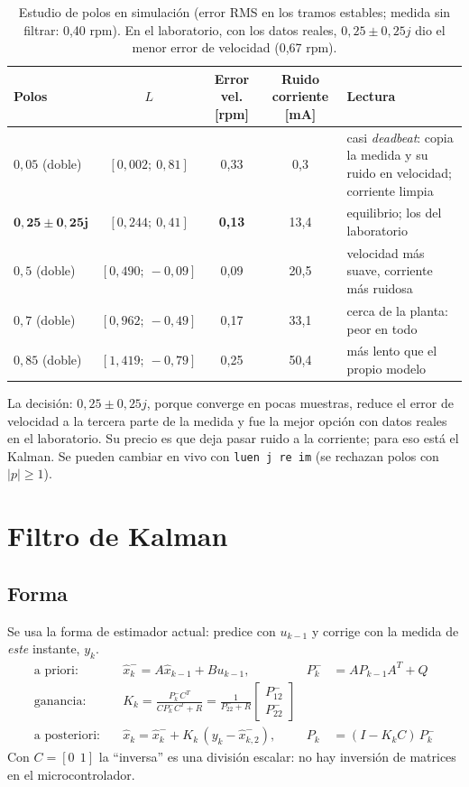 \documentclass[11pt]{article}
\newcommand{\cod}[1]{\texttt{#1}}
\begin{document}
\begin{table}[H]\centering\small
\begin{tabular}{lccc>{\raggedright\arraybackslash}p{5.2cm}}
\toprule
Polos & $L$ & Error vel. [rpm] & Ruido corriente [mA] & Lectura \\
\midrule
$0{,}05$ (doble) & $[0{,}002;\ 0{,}81]$ & 0,33 & 0,3 & casi \emph{deadbeat}: copia la medida y su ruido en velocidad; corriente limpia \\
$\mathbf{0{,}25\pm0{,}25j}$ & $[0{,}244;\ 0{,}41]$ & \textbf{0,13} & 13,4 & equilibrio; los del laboratorio \\
$0{,}5$ (doble) & $[0{,}490;\ -0{,}09]$ & 0,09 & 20,5 & velocidad más suave, corriente más ruidosa \\
$0{,}7$ (doble) & $[0{,}962;\ -0{,}49]$ & 0,17 & 33,1 & cerca de la planta: peor en todo \\
$0{,}85$ (doble) & $[1{,}419;\ -0{,}79]$ & 0,25 & 50,4 & más lento que el propio modelo \\
\bottomrule
\end{tabular}
\caption{Estudio de polos en simulación (error RMS en los tramos estables; medida sin filtrar: 0,40 rpm). En el laboratorio, con los datos reales, $0{,}25\pm0{,}25j$ dio el menor error de velocidad (0,67 rpm).}
\end{table}
La decisión: $0{,}25\pm0{,}25j$, porque converge en pocas muestras, reduce el error de velocidad a la tercera parte de la medida y fue la mejor opción con datos reales en el laboratorio. Su precio es que deja pasar ruido a la corriente; para eso está el Kalman. Se pueden cambiar en vivo con \cod{luen j re im} (se rechazan polos con $|p|\ge1$).

\section{Filtro de Kalman}

\subsection*{Forma}
Se usa la forma de estimador actual: predice con $u_{k-1}$ y corrige con la medida de \emph{este} instante, $y_k$.
\begin{align}
\text{a priori:}\quad & \hat x^-_k=A\hat x_{k-1}+Bu_{k-1}, & P^-_k&=AP_{k-1}A^T+Q\\
\text{ganancia:}\quad & K_k=\frac{P^-_kC^T}{CP^-_kC^T+R}=\frac{1}{P^-_{22}+R}\begin{bmatrix}P^-_{12}\\ P^-_{22}\end{bmatrix} & &\\
\text{a posteriori:}\quad & \hat x_k=\hat x^-_k+K_k\,(y_k-\hat x^-_{k,2}), & P_k&=(I-K_kC)\,P^-_k
\end{align}
Con $C=[0\ \ 1]$ la ``inversa'' es una división escalar: no hay inversión de matrices en el microcontrolador.
\end{document}
